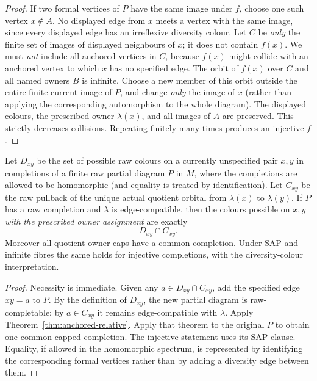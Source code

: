 \begin{proof}
If two formal vertices of $P$ have the same image under $f$, choose
one such vertex $x\notin A$.  No displayed edge from $x$ meets a
vertex with the same image, since every displayed edge has an
irreflexive diversity colour.  Let $C$ be \emph{only} the finite set of images of displayed
neighbours of $x$; it does not contain $f(x)$.  We must \emph{not}
include all anchored vertices in $C$, because $f(x)$ might collide
with an anchored vertex to which $x$ has no specified edge.
The orbit of $f(x)$ over $C$ and all named owners $B$ is infinite.
Choose a new member of this orbit outside the entire finite current
image of $P$, and change \emph{only} the image of $x$ (rather than
applying the corresponding automorphism to the whole diagram).
The displayed colours, the prescribed owner $\lambda(x)$, and
all images of $A$ are preserved.  This strictly decreases collisions.  Repeating finitely
many times produces an injective $f$.
\end{proof}

\begin{corollary}
\label{cor:relative-cap}
Let $D_{xy}$ be the set of possible raw colours on a currently
unspecified pair $x,y$ in completions of a finite raw partial
diagram $P$ in $M$, where the completions are allowed to be
homomorphic (and equality is treated by identification).  Let
$C_{xy}$ be the raw pullback of the unique actual quotient orbital
from $\lambda(x)$ to $\lambda(y)$.  If $P$ has a raw completion
and $\lambda$ is edge-compatible, then the colours possible on
$x,y$ \emph{with the prescribed owner assignment} are exactly
\[
                         D_{xy}\cap C_{xy}.
\]
Moreover all quotient owner caps have a common completion.  Under
SAP and infinite fibres the same holds for injective completions,
with the diversity-colour interpretation.
\end{corollary}
\begin{proof}
Necessity is immediate.  Given any $a\in D_{xy}\cap C_{xy}$,
add the specified edge $xy=a$ to $P$.  By the definition of
$D_{xy}$, the new partial diagram is raw-completable; by
$a\in C_{xy}$ it remains edge-compatible with $\lambda$.
Apply Theorem~\ref{thm:anchored-relative}.  Apply that theorem
to the original $P$ to obtain one common capped completion.
The injective statement uses its SAP clause.  Equality, if allowed
in the homomorphic spectrum, is represented by identifying the
corresponding formal vertices rather than by adding a diversity
edge between them.
\end{proof}


